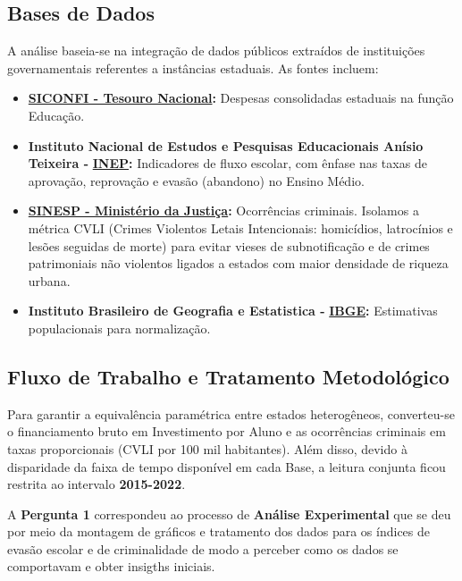 \documentclass[10pt]{article}
\begin{document}
\subsection{Bases de Dados}
A análise baseia-se na integração de dados públicos extraídos de instituições governamentais referentes a instâncias estaduais. As fontes incluem:
\begin{itemize}
    \item \textbf{\href{https://siconfi.tesouro.gov.br/siconfi/pages/public/consulta_finbra_rreo/finbra_rreo_list.jsf}{SICONFI - Tesouro Nacional}:} Despesas consolidadas estaduais na função Educação.
    \item \textbf{Instituto Nacional de Estudos e Pesquisas Educacionais Anísio Teixeira - } \textbf{\href{https://www.gov.br/inep/pt-br/acesso-a-informacao/dados-abertos/indicadores-educacionais/taxas-de-rendimento-escolar}{INEP}:} Indicadores de fluxo escolar, com ênfase nas taxas de aprovação, reprovação e evasão (abandono) no Ensino Médio.
    \item \textbf{\href{https://dados.mj.gov.br/dataset/sistema-nacional-de-estatisticas-de-seguranca-publica}{SINESP - Ministério da Justiça}:} Ocorrências criminais. Isolamos a métrica CVLI (Crimes Violentos Letais Intencionais: homicídios, latrocínios e lesões seguidas de morte) para evitar vieses de subnotificação e de crimes patrimoniais não violentos ligados a estados com maior densidade de riqueza urbana.
    \item \textbf{Instituto Brasileiro de Geografia e Estatistica - } \textbf{\href{https://www.ibge.gov.br/}{IBGE}:} Estimativas populacionais para normalização.
\end{itemize}

\subsection{Fluxo de Trabalho e Tratamento Metodológico}
Para garantir a equivalência paramétrica entre estados heterogêneos, converteu-se o financiamento bruto em Investimento por Aluno e as ocorrências criminais em taxas proporcionais (CVLI por 100 mil habitantes). Além disso, devido à disparidade da faixa de tempo disponível em cada Base, a leitura conjunta ficou restrita ao intervalo \textbf{2015-2022}.

A \textbf{Pergunta 1} correspondeu ao processo de \textbf{Análise Experimental} que se deu por meio da montagem de gráficos e tratamento dos dados para os índices de evasão escolar e de criminalidade de modo a perceber como os dados se comportavam e obter insigths iniciais.
\end{document}
